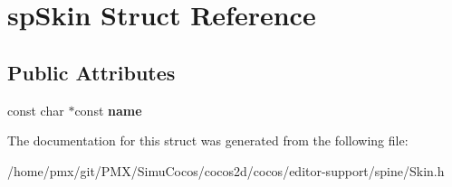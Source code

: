 \hypertarget{structspSkin}{}\section{sp\+Skin Struct Reference}
\label{structspSkin}
\subsection*{Public Attributes}
\begin{DoxyCompactItemize}
\item 
\mbox{\label{structspSkin_a74f23a05c2cff765bb07f2f0f15de614}} 
const char $\ast$const {\bfseries name}
\end{DoxyCompactItemize}


The documentation for this struct was generated from the following file\+:\begin{DoxyCompactItemize}
\item 
/home/pmx/git/\+P\+M\+X/\+Simu\+Cocos/cocos2d/cocos/editor-\/support/spine/Skin.\+h\end{DoxyCompactItemize}
